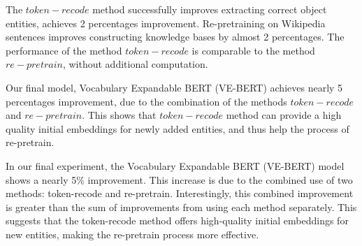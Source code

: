 \documentclass[]{ceurart}
\begin{document}
 The $token-recode$ method successfully improves extracting correct object entities, achieves 2 percentages improvement.   Re-pretraining on Wikipedia sentences improves constructing knowledge bases by almost 2 percentages. The performance of the method $token-recode$ is comparable to the method $re-pretrain$, without additional computation. 

Our final model, Vocabulary Expandable BERT (VE-BERT) achieves nearly 5 percentages improvement, due to the combination of the methods $token-recode$ and $re-pretrain$. This shows that $token-recode$ method can provide a high quality initial embeddings for newly added entities, and thus help the process of re-pretrain. 


In our final experiment, the Vocabulary Expandable BERT (VE-BERT) model shows a nearly 5\% improvement. This increase is due to the combined use of two methods:  token-recode and re-pretrain. Interestingly, this combined improvement is greater than the sum of improvements from using each method separately. This suggests that the token-recode  method offers high-quality initial embeddings for new entities, making the re-pretrain process more effective.
\end{document}
